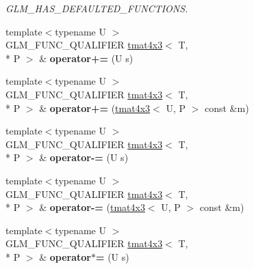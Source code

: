 \begin{DoxyCompactItemize}
\begin{DoxyCompactList}\small\item\em G\-L\-M\-\_\-\-H\-A\-S\-\_\-\-D\-E\-F\-A\-U\-L\-T\-E\-D\-\_\-\-F\-U\-N\-C\-T\-I\-O\-N\-S. \end{DoxyCompactList}\item 
\hypertarget{structglm_1_1tmat4x3_a81802f6d7ccf5136033aa43964c05b51}{{\footnotesize template$<$typename U $>$ }\\G\-L\-M\-\_\-\-F\-U\-N\-C\-\_\-\-Q\-U\-A\-L\-I\-F\-I\-E\-R \hyperlink{structglm_1_1tmat4x3}{tmat4x3}$<$ T, \\*
P $>$ \& {\bfseries operator+=} (U s)}\label{structglm_1_1tmat4x3_a81802f6d7ccf5136033aa43964c05b51}

\item 
\hypertarget{structglm_1_1tmat4x3_ac3328dbd930d4608781f9199cc793d17}{{\footnotesize template$<$typename U $>$ }\\G\-L\-M\-\_\-\-F\-U\-N\-C\-\_\-\-Q\-U\-A\-L\-I\-F\-I\-E\-R \hyperlink{structglm_1_1tmat4x3}{tmat4x3}$<$ T, \\*
P $>$ \& {\bfseries operator+=} (\hyperlink{structglm_1_1tmat4x3}{tmat4x3}$<$ U, P $>$ const \&m)}\label{structglm_1_1tmat4x3_ac3328dbd930d4608781f9199cc793d17}

\item 
\hypertarget{structglm_1_1tmat4x3_a07f1856eb5bd526ae5035b9506be5e31}{{\footnotesize template$<$typename U $>$ }\\G\-L\-M\-\_\-\-F\-U\-N\-C\-\_\-\-Q\-U\-A\-L\-I\-F\-I\-E\-R \hyperlink{structglm_1_1tmat4x3}{tmat4x3}$<$ T, \\*
P $>$ \& {\bfseries operator-\/=} (U s)}\label{structglm_1_1tmat4x3_a07f1856eb5bd526ae5035b9506be5e31}

\item 
\hypertarget{structglm_1_1tmat4x3_a8bfdcb72c5c392609d32e6cb9f312964}{{\footnotesize template$<$typename U $>$ }\\G\-L\-M\-\_\-\-F\-U\-N\-C\-\_\-\-Q\-U\-A\-L\-I\-F\-I\-E\-R \hyperlink{structglm_1_1tmat4x3}{tmat4x3}$<$ T, \\*
P $>$ \& {\bfseries operator-\/=} (\hyperlink{structglm_1_1tmat4x3}{tmat4x3}$<$ U, P $>$ const \&m)}\label{structglm_1_1tmat4x3_a8bfdcb72c5c392609d32e6cb9f312964}

\item 
\hypertarget{structglm_1_1tmat4x3_a29cf84d94484e36a48bc12dd82a92bb8}{{\footnotesize template$<$typename U $>$ }\\G\-L\-M\-\_\-\-F\-U\-N\-C\-\_\-\-Q\-U\-A\-L\-I\-F\-I\-E\-R \hyperlink{structglm_1_1tmat4x3}{tmat4x3}$<$ T, \\*
P $>$ \& {\bfseries operator$\ast$=} (U s)}\label{structglm_1_1tmat4x3_a29cf84d94484e36a48bc12dd82a92bb8}


\end{DoxyCompactItemize}

